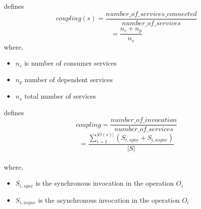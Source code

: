 {{\cite{Bingu-Shim:2008aa} defines
$$coupling(s) =  \frac{number\_of\_services\_connected}{number\_of\_services} $$ $$ =\frac{n_c + n_p}{n_s}$$
where, \\
\begin{itemize}[leftmargin=.5in]
\item $n_c$ is number of consumer services
\item $n_p$ number of dependent services
\item $n_s$ total number of services
\end{itemize}
\cite{Saad-Alahmari:2011aa} defines
$$coupling = \frac{number\_of\_invocation}{number\_of\_services}$$ $$=\frac{\sum_{i=1}^{|O(s)|} (S_{i,sync} + S_{i,async})}{|S|}$$
\\
where,
\\
\begin{itemize}[leftmargin=.5in]
\item $S_{i,sync}$ is the synchronous invocation in the operation $O_i$
\item $S_{i,async}$ is the asynchronous invocation in the operation $O_i$
\end{itemize}


}}

